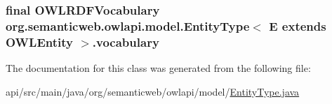 \hypertarget{classorg_1_1semanticweb_1_1owlapi_1_1model_1_1_entity_type_3_01_e_01extends_01_o_w_l_entity_01_4_a4f9794f343179e622f0973d5b25b8bac}{
\subsubsection[{vocabulary}]{\setlength{\rightskip}{0pt plus 5cm}final {\bf O\-W\-L\-R\-D\-F\-Vocabulary} org.\-semanticweb.\-owlapi.\-model.\-Entity\-Type$<$ E extends {\bf O\-W\-L\-Entity} $>$.vocabulary\hspace{0.3cm}{\ttfamily [private]}}}\label{classorg_1_1semanticweb_1_1owlapi_1_1model_1_1_entity_type_3_01_e_01extends_01_o_w_l_entity_01_4_a4f9794f343179e622f0973d5b25b8bac}


The documentation for this class was generated from the following file\-:\begin{DoxyCompactItemize}
\item 
api/src/main/java/org/semanticweb/owlapi/model/\hyperlink{_entity_type_8java}{Entity\-Type.\-java}\end{DoxyCompactItemize}
